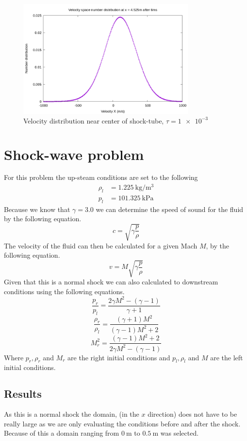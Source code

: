 \documentclass[paper=a4, fontsize=12pt]{scrartcl}
\begin{document}
\begin{figure}[H]
        \centering
        \includegraphics[width=0.8\textwidth]{center_shock}
        \caption{Velocity distribution near center of shock-tube, $\tau = \SI{1e-3}{}$}
        \label{fig:center_shock}
\end{figure}


\section{Shock-wave problem}
For this problem the up-steam conditions are set to the following
\begin{align*}
        \rho_l &= \SI{1.225}{\kilogram \per \meter^3}\\
        p_l &= \SI{101.325}{\kilo \pascal}
\end{align*}
Because we know that $\gamma = 3.0$ we can determine the speed of sound for the fluid by the following
equation.
\[
        c= \sqrt{\gamma \frac{p}{\rho}}
\]
The velocity of the fluid can then be calculated for a given Mach $M$, by the following equation.
\[
v = M \sqrt{\gamma \frac{p}{\rho}}
\]
Given that this is a normal shock we can also calculated to downstream conditions using the following
equations.
\[
        \frac{p_r}{p_l} = \frac{2 \gamma M^2 - (\gamma-1)}{\gamma+1}
\]
\[
        \frac{\rho_r}{\rho_l} = \frac{(\gamma+1)M^2}{(\gamma-1)M^2 +2}
\]
\[
        M_r^2= \frac{(\gamma -1)M^2 +2}{2\gamma M^2-(\gamma-1)}
\]
Where $p_r, \rho_r$ and $M_r$ are the right initial conditions and
$p_l, \rho_l$ and $M$ are the left initial conditions.
\subsection{Results}
As this is a normal shock the domain, (in the $x$ direction) does not have to be really large as we are only
evaluating the conditions before and after the shock.
Because of this a domain ranging from $\SI{0}{\meter}$ to $\SI{0.5}{\meter}$ was selected.
\end{document}
